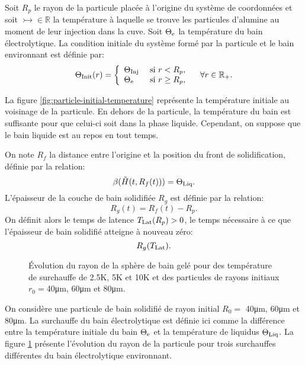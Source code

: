 Soit $R_p$ le rayon de la particule placée à l'origine du système de
coordonnées et soit $\tinj\in\mathbb R$ la température à laquelle se
trouve les particules d'alumine au moment de leur injection dans la
cuve. Soit $\Theta_\mathrm{e}$ la température du bain électrolytique. La
condition initiale du système formé par la particule et le bain
environnant est définie par:
\begin{equation}
  \Theta_\text{Init}(r) = \left\{
  \begin{array}{ll}
    \Theta_\text{Inj} & \text{ si } r < R_p,\\
    \Theta_\mathrm{e} & \text{ si } r \geq R_p,\\
  \end{array}
  \right.\quad \forall r\in \mathbb R_+ .\label{eq:initial-temperature}
\end{equation}

La figure \ref{fig:particle-initial-temperature} représente la
température initiale au voisinage de la particule. En dehors de la
particule, la température du bain est suffisante pour que celui-ci
soit dans la phase liquide. Cependant, on suppose que le bain liquide
est au repos en tout temps.

On note $R_f$ la distance entre l'origine et la position du front de
solidification, définie par la relation:
\begin{equation}
\beta(\tilde{H}(t, R_f(t))) = \Theta_\text{Liq}.
\end{equation}
L'épaisseur de la couche de bain solidifiée $R_g$ est définie par la
relation:
\begin{equation}
R_g(t) = R_f(t) - R_p.
\end{equation}
On définit alors le temps de latence $T_\text{Lat}(R_p) > 0$, le temps
nécessaire à ce que l'épaisseur de bain solidifié atteigne à nouveau
zéro:
\begin{equation}
  R_g(T_\text{Lat}).
\end{equation}

\begin{figure}
\begin{center}
  
  
  
  \caption{Évolution du rayon de la sphère de bain gelé pour des
    température de surchauffe de \num{2.5}\si{\kelvin},
    \num{5}\si{\kelvin} et \num{10}\si{\kelvin} et des particules de
    rayons initiaux $r_0 = $\num{40}\si{\micro\meter},
    \num{60}\si{\micro\meter} et \num{80}\si{\micro\meter}.}
  \label{fig:freeze-radius}
\end{center}
\end{figure}
On considère une particule de bain solidifié de rayon initial $R_0 =$
\num{40}\si{\micro\meter}, \num{60}\si{\micro\meter} et
\num{80}\si{\micro\meter}. La surchauffe du bain électrolytique est
définie ici comme la différence entre la température initiale du bain
$\Theta_\mathrm{e}$ et la température de liquidus $\Theta_\text{Liq}$. La figure
\ref{fig:freeze-radius} présente l'évolution du rayon de la particule
pour trois surchauffes différentes du bain électrolytique environnant.

